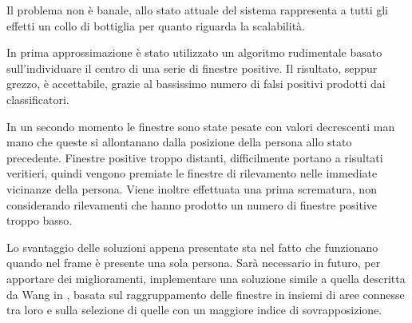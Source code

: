         Il problema non è banale, allo stato attuale del sistema rappresenta a tutti gli effetti un collo di bottiglia per quanto riguarda la scalabilità.
        
        In prima approssimazione è stato utilizzato un algoritmo rudimentale basato sull'individuare il centro di una serie di finestre positive.
        Il risultato, seppur grezzo, è accettabile, grazie al bassissimo numero di falsi positivi prodotti dai classificatori. 

        In un secondo momento le finestre sono state pesate con valori decrescenti man mano che queste si allontanano dalla posizione della persona allo stato precedente.
        Finestre positive troppo distanti, difficilmente portano a risultati veritieri, quindi vengono premiate le finestre di rilevamento nelle immediate vicinanze della persona.
        Viene inoltre effettuata una prima scrematura, non considerando rilevamenti che hanno prodotto un numero di finestre positive troppo basso.

        Lo svantaggio delle soluzioni appena presentate sta nel fatto che funzionano quando nel frame è presente una sola persona.
        Sarà necessario in futuro, per apportare dei miglioramenti, implementare una soluzione simile a quella descritta da Wang in \cite{Wang14}, basata sul raggruppamento delle finestre in insiemi di aree connesse tra loro e sulla selezione di quelle con un maggiore indice di sovrapposizione. 